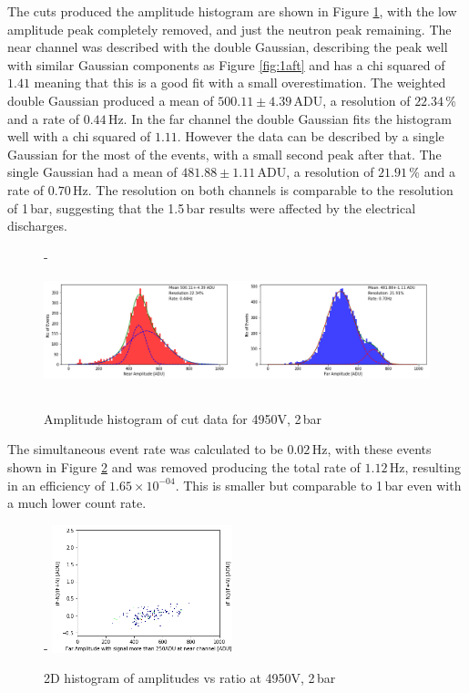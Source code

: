 \documentclass[a4paper]{article}
\begin{document}
\noindent The cuts produced the amplitude histogram are shown in Figure \ref{fig:3amp}, with the low amplitude peak completely removed, and just the neutron peak remaining. 
\newline The near channel was described with the double Gaussian, describing the peak well with similar Gaussian components as Figure \ref{fig:1aft} and has a chi squared of $1.41$ meaning that this is a good fit with a small overestimation. The weighted double Gaussian produced a mean of $500.11 \pm 4.39$\,ADU, a resolution of $22.34$\,\% and a rate of $0.44$\,Hz.
\newline In the far channel the double Gaussian fits the histogram well with a chi squared of $1.11$. However the data can be described by a single Gaussian for the most of the events, with a small second peak after that. The single Gaussian had a mean of $481.88 \pm 1.11$\,ADU, a resolution of $21.91$\,\% and a rate of $0.70$\,Hz. The resolution on both channels is comparable to the resolution of 1\,bar, suggesting that the 1.5\,bar results were affected by the electrical discharges.
\begin{figure}[H]-
    \centering
    \includegraphics[height=3.7cm]{uk26n000_amp.png}
    \caption{Amplitude histogram of cut data for 4950V, 2\,bar}
    \label{fig:3amp}
\end{figure}
\noindent The simultaneous event rate was calculated to be $0.02$\,Hz, with these events shown in Figure \ref{fig:3sym} and was removed producing the total rate of $1.12$\,Hz, resulting in an efficiency of $1.65\times 10^{-04}$. This is smaller but comparable to 1\,bar even with a much lower count rate.
\begin{figure}[H]-
    \centering
    \includegraphics[height=3.7cm]{uk26n000_symcheck2.png}
    \caption{2D histogram of amplitudes vs ratio at 4950V, 2\,bar}
    \label{fig:3sym}
\end{figure}
\end{document}

